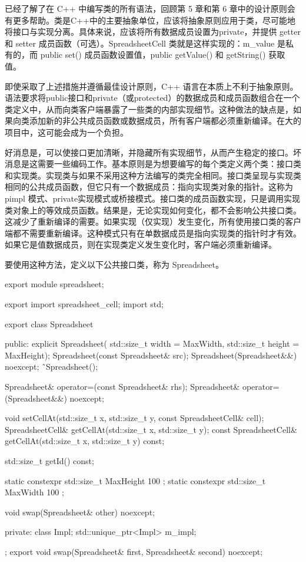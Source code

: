 
已经了解了在 C++ 中编写类的所有语法，回顾第 5 章和第 6 章中的设计原则会有更多帮助。类是C++中的主要抽象单位，应该将抽象原则应用于类，尽可能地将接口与实现分离。具体来说，应该将所有数据成员设置为private，并提供 getter 和 setter 成员函数（可选）。SpreadsheetCell 类就是这样实现的：m\_value 是私有的，而 public set() 成员函数设置值，public getValue() 和 getString() 获取值。


即使采取了上述措施并遵循最佳设计原则，C++ 语言在本质上不利于抽象原则。语法要求将public接口和private（或protected）的数据成员和成员函数组合在一个类定义中，从而向类客户端暴露了一些类的内部实现细节。这种做法的缺点是，如果向类添加新的非公共成员函数或数据成员，所有客户端都必须重新编译。在大的项目中，这可能会成为一个负担。

好消息是，可以使接口更加清晰，并隐藏所有实现细节，从而产生稳定的接口。坏消息是这需要一些编码工作。基本原则是为想要编写的每个类定义两个类：接口类和实现类。实现类与如果不采用这种方法编写的类完全相同。接口类呈现与实现类相同的公共成员函数，但它只有一个数据成员：指向实现类对象的指针。这称为 pimpl 模式、private实现模式或桥接模式。接口类的成员函数实现，只是调用实现类对象上的等效成员函数。结果是，无论实现如何变化，都不会影响公共接口类。这减少了重新编译的需要。如果实现（仅实现）发生变化，所有使用接口类的客户端都不需要重新编译。这种模式只有在单数据成员是指向实现类的指针时才有效。如果它是值数据成员，则在实现类定义发生变化时，客户端必须重新编译。

要使用这种方法，定义以下公共接口类，称为 Spreadsheet。

\begin{cpp}
export module spreadsheet;

export import spreadsheet_cell;
import std;

export class Spreadsheet
{
    public:
        explicit Spreadsheet(
            std::size_t width = MaxWidth, std::size_t height = MaxHeight);
        Spreadsheet(const Spreadsheet& src);
        Spreadsheet(Spreadsheet&&) noexcept;
        ˜Spreadsheet();

        Spreadsheet& operator=(const Spreadsheet& rhs);
        Spreadsheet& operator=(Spreadsheet&&) noexcept;

        void setCellAt(std::size_t x, std::size_t y, const SpreadsheetCell& cell);
        SpreadsheetCell& getCellAt(std::size_t x, std::size_t y);
        const SpreadsheetCell& getCellAt(std::size_t x, std::size_t y) const;

        std::size_t getId() const;

        static constexpr std::size_t MaxHeight { 100 };
        static constexpr std::size_t MaxWidth { 100 };

        void swap(Spreadsheet& other) noexcept;

    private:
        class Impl;
        std::unique_ptr<Impl> m_impl;
};
export void swap(Spreadsheet& first, Spreadsheet& second) noexcept;
\end{cpp}

